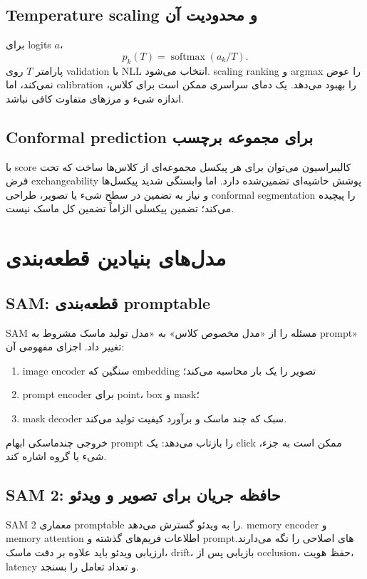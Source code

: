 \documentclass[12pt,openany,oneside]{book}
\newcommand{\softmax}{\operatorname{softmax}}
\begin{document}
\subsection{Temperature scaling و محدودیت آن}
برای logits \(a\)،
\[
p_k(T)=\softmax(a_k/T).
\]
پارامتر \(T\) روی validation با NLL انتخاب می‌شود. scaling ranking و argmax را عوض نمی‌کند، اما calibration را
بهبود می‌دهد. یک دمای سراسری ممکن است برای کلاس، اندازه شیء و مرزهای متفاوت کافی نباشد.

\subsection{Conformal prediction برای مجموعه برچسب}
با score کالیبراسیون می‌توان برای هر پیکسل مجموعه‌ای از کلاس‌ها ساخت که تحت فرض exchangeability پوشش حاشیه‌ای
تضمین‌شده دارد. اما وابستگی شدید پیکسل‌ها و نیاز به تضمین در سطح شیء یا تصویر، طراحی conformal segmentation را
پیچیده می‌کند؛ تضمین پیکسلی الزاماً تضمین کل ماسک نیست.

\section{مدل‌های بنیادین قطعه‌بندی}
\subsection{SAM: قطعه‌بندی promptable}
SAM مسئله را از «مدل مخصوص کلاس» به «مدل تولید ماسک مشروط به prompt» تغییر داد. اجزای مفهومی آن:
\begin{enumerate}
\item image encoder سنگین که embedding تصویر را یک بار محاسبه می‌کند؛
\item prompt encoder برای point، box و mask؛
\item mask decoder سبک که چند ماسک و برآورد کیفیت تولید می‌کند.
\end{enumerate}
خروجی چندماسکی ابهام prompt را بازتاب می‌دهد: یک click ممکن است به جزء، شیء یا گروه اشاره کند.

\subsection{SAM 2: حافظه جریان برای تصویر و ویدئو}
SAM 2 معماری promptable را به ویدئو گسترش می‌دهد. memory encoder و memory attention اطلاعات فریم‌های گذشته و
promptهای اصلاحی را نگه می‌دارند. ارزیابی ویدئو باید علاوه بر دقت ماسک، drift، بازیابی پس از occlusion، حفظ هویت،
latency و تعداد تعامل را بسنجد.
\end{document}
